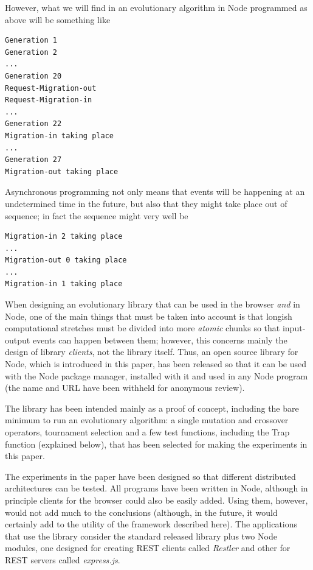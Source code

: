 \documentclass{sig-alternate}
\begin{document}
However, what we will find in an evolutionary algorithm in Node
programmed as above will be something like
\begin{lstlisting}
Generation 1
Generation 2
...
Generation 20
Request-Migration-out
Request-Migration-in
...
Generation 22
Migration-in taking place
...
Generation 27
Migration-out taking place
\end{lstlisting}
Asynchronous programming not only means that events will be happening
at an undetermined time in the future, but also that they might take
place out of sequence; in fact the sequence might very well be
\begin{lstlisting}
Migration-in 2 taking place
...
Migration-out 0 taking place
...
Migration-in 1 taking place
\end{lstlisting}

When designing an evolutionary library that can be used in the browser
{\em and} in Node, one of the main things that must be taken
into account is that longish computational stretches must be divided
into more {\em atomic} chunks so that input-output events can happen
between them; however, this concerns mainly the design of library {\em
  clients}, not the library itself. Thus, an open source library for
Node, which is introduced in this paper, has been released  
so that it can be used with the Node package
manager, installed with it and used in any Node program (the name and
URL have been withheld for anonymous review).

The library has been intended mainly as a proof of concept, including
the bare minimum to run an evolutionary algorithm: a single mutation
and crossover operators, tournament selection and a few test
functions, including the Trap function (explained below), that has been selected for
making the experiments in this paper. 


The experiments in the paper have been designed so that different
distributed architectures can be tested. All programs have been
written in Node, although in principle clients for the browser could
also be easily added. Using them, however, would not add much to the
conclusions (although, in the future, it would certainly add to the
utility of the framework described here). The applications that use
the library consider the standard released library plus two Node modules,
one designed for creating REST clients called {\em Restler} and other
for REST servers called {\em express.js}. 
\end{document}
